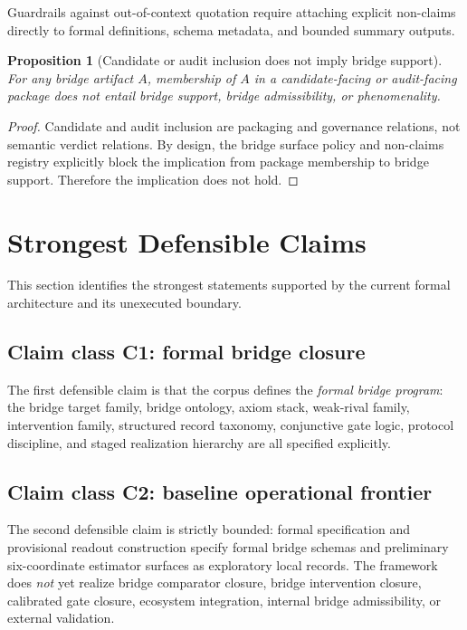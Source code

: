 \documentclass[11pt,a4paper]{article}
\newtheorem{proposition}[theorem]{Proposition}
\theoremstyle{definition}
\begin{document}
Guardrails against out-of-context quotation require attaching explicit non-claims directly to formal definitions, schema metadata, and bounded summary outputs.

\begin{proposition}[Candidate or audit inclusion does not imply bridge support]
For any bridge artifact $A$, membership of $A$ in a candidate-facing or audit-facing package does not entail bridge support, bridge admissibility, or phenomenality.
\end{proposition}

\begin{proof}
Candidate and audit inclusion are packaging and governance relations, not semantic verdict relations. By design, the bridge surface policy and non-claims registry explicitly block the implication from package membership to bridge support. Therefore the implication does not hold.
\end{proof}

\section{Strongest Defensible Claims}
This section identifies the strongest statements supported by the current formal architecture and its unexecuted boundary.

\subsection{Claim class C1: formal bridge closure}
The first defensible claim is that the corpus defines the \emph{formal bridge program}: the bridge target family, bridge ontology, axiom stack, weak-rival family, intervention family, structured record taxonomy, conjunctive gate logic, protocol discipline, and staged realization hierarchy are all specified explicitly.

\subsection{Claim class C2: baseline operational frontier}
The second defensible claim is strictly bounded: formal specification and provisional readout construction specify formal bridge schemas and preliminary six-coordinate estimator surfaces as exploratory local records. The framework does \emph{not} yet realize bridge comparator closure, bridge intervention closure, calibrated gate closure, ecosystem integration, internal bridge admissibility, or external validation.
\end{document}
